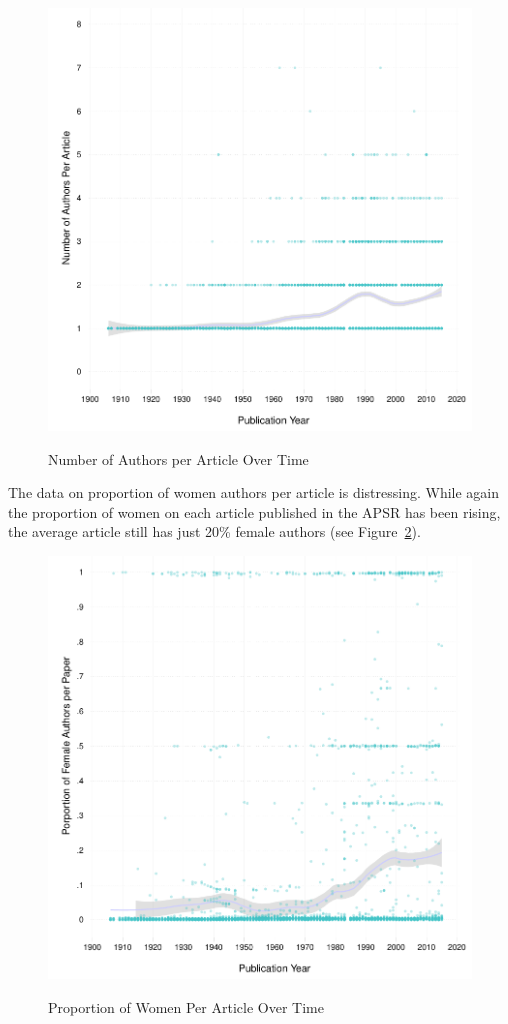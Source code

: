 \documentclass[11pt]{article}
\begin{document}
\begin{figure}[htbp]
\centering
\caption{Number of Authors per Article Over Time}
\includegraphics[scale=.85]{../figs/n_authors_per_article_over_time.pdf}
\label{fig:nauthors}
\end{figure}

The data on proportion of women authors per article is distressing. While again the proportion of women on each article published in the APSR has been rising, the average article still has just 20\% female authors (see Figure~\ref{fig:women}).  

\begin{figure}[htbp]
\centering
\caption{Proportion of Women Per Article Over Time}
\includegraphics[scale=.85]{../figs/gender_authors_per_article_over_time.pdf}
\label{fig:women}
\end{figure}
\end{document}
